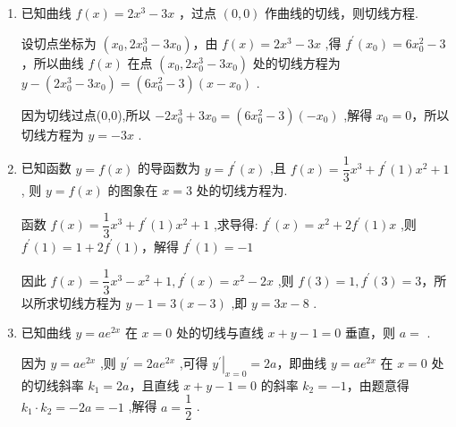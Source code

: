 \begin{enumerate}
    \item 已知曲线 $f\left( x\right)  = 2{x}^{3} - {3x}$ ，过点 $\left( {0,0}\right)$ 作曲线的切线，则切线方程.
    \begin{jieda}
        设切点坐标为 $\left( {{x}_{0},2{x}_{0}^{3} - 3{x}_{0}}\right)$，由 $f\left( x\right)  = 2{x}^{3} - {3x}$ ,得 ${f}^{\prime }\left( {x}_{0}\right)  = 6{x}_{0}^{2} - 3$，所以曲线 $f\left( x\right)$ 在点 $\left( {{x}_{0},2{x}_{0}^{3} - 3{x}_{0}}\right)$ 处的切线方程为 $y - \left( {2{x}_{0}^{3} - 3{x}_{0}}\right)  = \left( {6{x}_{0}^{2} - 3}\right) \left( {x - {x}_{0}}\right)$ .
        
        因为切线过点(0,0),所以 $- 2{x}_{0}^{3} + 3{x}_{0} = \left( {6{x}_{0}^{2} - 3}\right) \left( {-{x}_{0}}\right)$ ,解得 ${x}_{0} = 0$，所以切线方程为 $y =  - {3x}$ .
    \end{jieda}

    \item 已知函数 $y = f\left( x\right)$ 的导函数为 $y = {f}^{\prime }\left( x\right)$ ,且 $f\left( x\right)  = \dfrac{1}{3}{x}^{3} + {f}^{\prime }\left( 1\right) {x}^{2} + 1$ , 则 $y = f\left( x\right)$ 的图象在 $x = 3$ 处的切线方程为.
    \begin{jieda}
        函数 $f\left( x\right)  = \dfrac{1}{3}{x}^{3} + {f}^{\prime }\left( 1\right) {x}^{2} + 1$ ,求导得: ${f}^{\prime }\left( x\right)  = {x}^{2} + 2{f}^{\prime }\left( 1\right) x$ ,则 ${f}^{\prime }\left( 1\right)  = 1 + 2{f}^{\prime }\left( 1\right)$，解得 ${f}^{\prime }\left( 1\right)  =  - 1$ 
        
        因此 $f\left( x\right)  = \dfrac{1}{3}{x}^{3} - {x}^{2} + 1,{f}^{\prime }\left( x\right)  = {x}^{2} - {2x}$ ,则 $f\left( 3\right)  = 1,{f}^{\prime }\left( 3\right)  = 3$，所以所求切线方程为 $y - 1 = 3\left( {x - 3}\right)$ ,即 $y = {3x} - 8$ .
    \end{jieda}

    \item 已知曲线 $y = a{{e}}^{2x}$ 在 $x = 0$ 处的切线与直线 $x + y - 1 = 0$ 垂直，则 $a =$ .
    \begin{jieda}
        因为 $y = a{{e}}^{2x}$ ,则 ${y}^{\prime } = {2a}{{e}}^{2x}$ ,可得 ${\left. {y}^{\prime }\right| }_{x = 0} = {2a}$，即曲线 $y = a{{e}}^{2x}$ 在 $x = 0$ 处的切线斜率 ${k}_{1} = {2a}$，且直线 $x + y - 1 = 0$ 的斜率 ${k}_{2} =  - 1$，由题意得 ${{k}}_{1} \cdot  {{k}}_{2} =  - {2a} =  - 1$ ,解得 $a = \dfrac{1}{2}$ .
    \end{jieda}


\end{enumerate}
